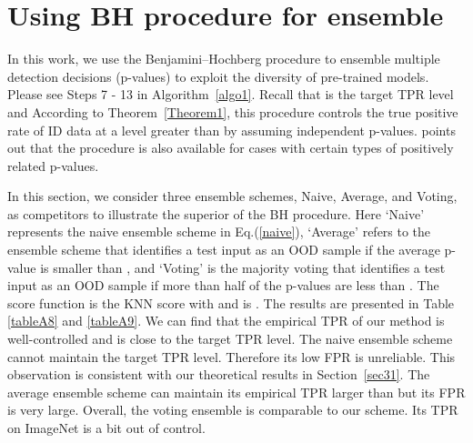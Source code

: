\documentclass{article} \usepackage{iclr2023_conference,times}
\begin{document}
\section{Using BH procedure for ensemble}\label{App:D}


In this work, we use the Benjamini–Hochberg procedure \citep{benjamini1995controlling} to ensemble multiple detection decisions (p-values) to exploit the diversity of pre-trained models. Please see Steps 7 - 13 in Algorithm~\ref{algo1}.
Recall that  is the target TPR level and  
According to Theorem~\ref{Theorem1}, this procedure controls the true positive rate of ID data at a level greater than  by assuming independent p-values. 
\cite{benjamini2001control} points out that the procedure is also available for cases with certain types of positively related p-values.



In this section, we consider three ensemble schemes, Naive, Average, and Voting, as competitors to illustrate the superior of the BH procedure. Here `Naive' represents the naive ensemble scheme in Eq.(\ref{naive}), `Average' refers to the ensemble scheme that identifies a test input as an OOD sample if the average p-value is smaller than , and `Voting' is the majority voting that identifies a test input as an OOD sample if more than half of the p-values are less than 
.
The score function is the KNN score \citep{sun2022knn} with  and  is . The results are presented in Table \ref{tableA8} and \ref{tableA9}.
We can find that the empirical TPR of our method is well-controlled and is close to the target TPR level. The naive ensemble scheme cannot maintain the target TPR level. Therefore its low FPR is unreliable. This observation is consistent with our theoretical results in Section~\ref{sec31}. The average ensemble scheme can maintain its empirical TPR larger than  but its FPR is very large. Overall, the voting ensemble is comparable to our scheme. Its TPR on ImageNet is a bit out of control.
\end{document}
